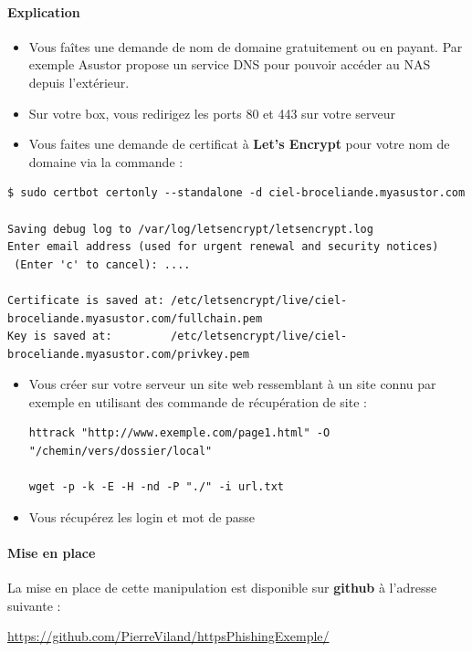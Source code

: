 \documentclass[french, 12pt]{article}%
\newcommand{\itemE}{\item[$\bullet$]}
\begin{document}
\paragraph{Explication}

\begin{itemize}
\itemE Vous faîtes une demande de nom de domaine gratuitement ou en payant. Par exemple Asustor propose un service DNS pour pouvoir accéder au NAS depuis l'extérieur. 
\itemE Sur votre box, vous redirigez les ports 80 et 443 sur votre serveur
\itemE Vous faites une demande de certificat à  \textbf{Let's Encrypt} pour votre nom de domaine via la commande :  
\end{itemize}

\begin{lstlisting}[style=commande]
$ sudo certbot certonly --standalone -d ciel-broceliande.myasustor.com

Saving debug log to /var/log/letsencrypt/letsencrypt.log
Enter email address (used for urgent renewal and security notices)
 (Enter 'c' to cancel): ....
 
Certificate is saved at: /etc/letsencrypt/live/ciel-broceliande.myasustor.com/fullchain.pem
Key is saved at:         /etc/letsencrypt/live/ciel-broceliande.myasustor.com/privkey.pem
\end{lstlisting}    

\begin{itemize}
\itemE Vous créer sur votre serveur un site web ressemblant à un site connu par exemple en utilisant des commande de récupération de site : 
\begin{lstlisting}[style=commande]
httrack "http://www.exemple.com/page1.html" -O "/chemin/vers/dossier/local"

wget -p -k -E -H -nd -P "./" -i url.txt
\end{lstlisting}



\itemE Vous récupérez les login et mot de passe
\end{itemize}



\paragraph{Mise en place}

La mise en place de cette manipulation est disponible sur \textbf{github} à l'adresse suivante  : 

\href{https://github.com/PierreViland/httpsPhishingExemple/}{https://github.com/PierreViland/httpsPhishingExemple/}
\end{document}
